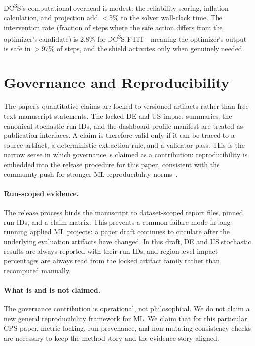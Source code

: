 \documentclass[11pt,a4paper,twocolumn]{article}
\begin{document}
DC\textsuperscript{3}S's computational overhead is modest: the reliability scoring, inflation calculation, and projection add $<$5\% to the solver wall-clock time. The intervention rate (fraction of steps where the safe action differs from the optimizer's candidate) is 2.8\% for DC\textsuperscript{3}S FTIT---meaning the optimizer's output is safe in $>$97\% of steps, and the shield activates only when genuinely needed.

\section{Governance and Reproducibility}\label{sec:governance}

The paper's quantitative claims are locked to versioned artifacts rather than free-text manuscript statements. The locked DE and US impact summaries, the canonical stochastic run IDs, and the dashboard profile manifest are treated as publication interfaces. A claim is therefore valid only if it can be traced to a source artifact, a deterministic extraction rule, and a validator pass. This is the narrow sense in which governance is claimed as a contribution: reproducibility is embedded into the release procedure for this paper, consistent with the community push for stronger ML reproducibility norms~\cite{pineau2021improving}.

\paragraph{Run-scoped evidence.}
The release process binds the manuscript to dataset-scoped report files, pinned run IDs, and a claim matrix. This prevents a common failure mode in long-running applied ML projects: a paper draft continues to circulate after the underlying evaluation artifacts have changed. In this draft, DE and US stochastic results are always reported with their run IDs, and region-level impact percentages are always read from the locked artifact family rather than recomputed manually.

\paragraph{What is and is not claimed.}
The governance contribution is operational, not philosophical. We do not claim a new general reproducibility framework for ML. We claim that for this particular CPS paper, metric locking, run provenance, and non-mutating consistency checks are necessary to keep the method story and the evidence story aligned.
\end{document}
